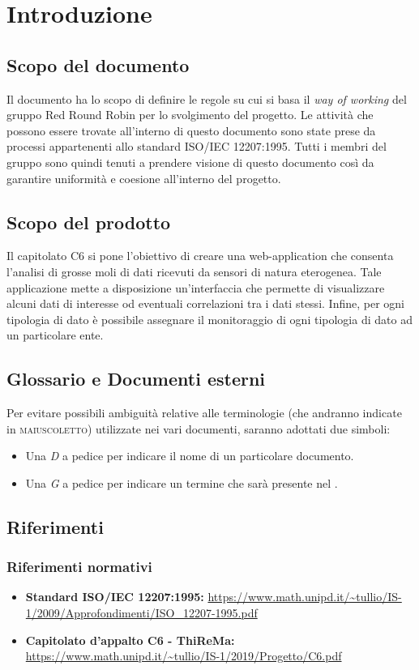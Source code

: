 \section{Introduzione}
	\subsection{Scopo del documento}
		Il documento ha lo scopo di definire le regole su cui si basa il \textit{way of working} del gruppo Red Round Robin per lo svolgimento del progetto. Le attività che possono essere trovate all'interno di questo documento sono state prese da processi appartenenti allo standard ISO/IEC 12207:1995. Tutti i membri del gruppo sono quindi tenuti a prendere visione di questo documento così da garantire uniformità e coesione all'interno del progetto.   
	\subsection{Scopo del prodotto}
		Il capitolato C6 si pone l'obiettivo di creare una web-application che consenta l'analisi di grosse moli di dati ricevuti da sensori di natura eterogenea. Tale applicazione mette a disposizione un'interfaccia che permette di visualizzare alcuni dati di interesse od eventuali correlazioni tra i dati stessi. Infine, per ogni tipologia di dato è possibile assegnare il monitoraggio di ogni tipologia di dato ad un particolare ente. 
	\subsection{Glossario e Documenti esterni}
		Per evitare possibili ambiguità relative alle terminologie (che andranno indicate in \textsc{maiuscoletto}) utilizzate nei vari documenti, saranno adottati due simboli:
		\begin{itemize}
			\item Una \textit{D} a pedice per indicare il nome di un particolare documento.
			\item Una \textit{G} a pedice per indicare un termine che sarà 
			presente nel .
		\end{itemize}
	\subsection{Riferimenti}

		\subsubsection{Riferimenti normativi}
			\begin{itemize}
				\item \textbf{Standard ISO/IEC 12207:1995: } 
				\url{https://www.math.unipd.it/~tullio/IS-1/2009/Approfondimenti/ISO_12207-1995.pdf}
				\item \textbf{Capitolato d'appalto C6 - ThiReMa: } 
				\url{https://www.math.unipd.it/~tullio/IS-1/2019/Progetto/C6.pdf}
			\end{itemize}	
